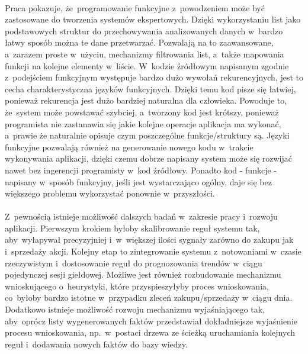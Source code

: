 \paragraph{}
Praca pokazuje, że~programowanie funkcyjne z~powodzeniem może być zastosowane do tworzenia systemów ekspertowych. Dzięki wykorzystaniu list jako podstawowych struktur do przechowywania analizowanych danych w~bardzo łatwy sposób można te dane przetwarzać. Pozwalają na to zaawansowane, a~zarazem proste w~użyciu, mechanizmy filtrowania list, a~także mapowania funkcji na kolejne elementy w~liście. W~kodzie źródłowym napisanym zgodnie z~podejściem funkcyjnym występuje bardzo dużo wywołań rekurencyjnych, jest to cecha charakterystyczna języków funkcyjnych. Dzięki temu kod pisze się łatwiej, ponieważ rekurencja jest dużo bardziej naturalna dla człowieka. Powoduje to, że~system może powstawać szybciej, a~tworzony kod jest krótszy, ponieważ programista nie zastanawia się jakie kolejne operacje aplikacja ma wykonać, a~prawie że naturalnie opisuje czym poszczególne funkcje/struktury są. Języki funkcyjne pozwalają również na generowanie nowego kodu w~trakcie wykonywania aplikacji, dzięki czemu dobrze napisany system może się rozwijać nawet bez ingerencji programisty w~kod źródłowy. Ponadto kod - funkcje - napisany w~sposób funkcyjny, jeśli jest wystarczająco ogólny, daje się bez większego problemu wykorzystać ponownie w~przyszłości.

\paragraph{}
Z~pewnością istnieje możliwość dalszych badań w~zakresie pracy i~rozwoju aplikacji. Pierwszym krokiem byłoby skalibrowanie reguł systemu tak, aby~wyłapywał precyzyjniej i~w~większej ilości sygnały zarówno do zakupu jak i~sprzedaży akcji. Kolejny etap to zintegrowanie systemu z~notowaniami w~czasie rzeczywistym i~dostosowanie reguł do prognozowania trendów w~ciągu pojedynczej sesji giełdowej. Możliwe jest również rozbudowanie mechanizmu wnioskującego o~heurystyki, które przyspieszyłyby proces wnioskowania, co~byłoby bardzo istotne w~przypadku zleceń zakupu/sprzedaży w~ciągu dnia. Dodatkowo istnieje możliwość rozwoju mechanizmu wyjaśniającego tak, aby~oprócz listy wygenerowanych faktów przedstawiał dokładniejsze wyjaśnienie procesu wnioskowania, np.~w~postaci drzewa ze ścieżką uruchamiania kolejnych reguł i~dodawania nowych faktów do bazy wiedzy.